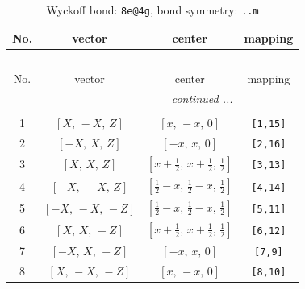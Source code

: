 \documentclass[fleqn,8pt]{jsarticle}
\begin{document}
\begin{longtable}{cccc}
\caption{Wyckoff bond: {\tt 8e@4g}, bond symmetry: {\tt ..m}}
 \\
 \hline \hline
No. & vector & center & mapping \\ \hline \endfirsthead

\multicolumn{3}{l}{\tablename\ \thetable{}} \\
 \hline \hline
No. & vector & center & mapping \\ \hline \endhead

 \hline \hline
\multicolumn{3}{r}{\footnotesize\it continued ...} \\ \endfoot

 \hline \hline
\multicolumn{3}{r}{} \\ \endlastfoot

1 & $\left[ X,\, - X,\, Z \right]$ & $\left[ x,\, - x,\, 0 \right]$ & {\tt [1,15]} \\ \hline
2 & $\left[ - X,\, X,\, Z \right]$ & $\left[ - x,\, x,\, 0 \right]$ & {\tt [2,16]} \\ \hline
3 & $\left[ X,\, X,\, Z \right]$ & $\left[ x + \frac{1}{2},\, x + \frac{1}{2},\, \frac{1}{2} \right]$ & {\tt [3,13]} \\ \hline
4 & $\left[ - X,\, - X,\, Z \right]$ & $\left[ \frac{1}{2} - x,\, \frac{1}{2} - x,\, \frac{1}{2} \right]$ & {\tt [4,14]} \\ \hline
5 & $\left[ - X,\, - X,\, - Z \right]$ & $\left[ \frac{1}{2} - x,\, \frac{1}{2} - x,\, \frac{1}{2} \right]$ & {\tt [5,11]} \\ \hline
6 & $\left[ X,\, X,\, - Z \right]$ & $\left[ x + \frac{1}{2},\, x + \frac{1}{2},\, \frac{1}{2} \right]$ & {\tt [6,12]} \\ \hline
7 & $\left[ - X,\, X,\, - Z \right]$ & $\left[ - x,\, x,\, 0 \right]$ & {\tt [7,9]} \\ \hline
8 & $\left[ X,\, - X,\, - Z \right]$ & $\left[ x,\, - x,\, 0 \right]$ & {\tt [8,10]} \\
\end{longtable}
\renewcommand{\arraystretch}{1.2}
\end{document}
